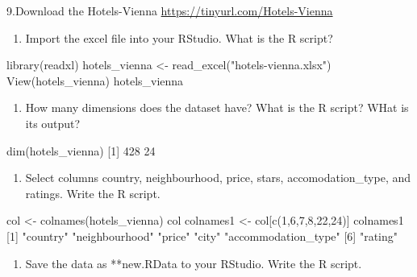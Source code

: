 \documentclass[
]{article}
\newenvironment{Shaded}{\begin{snugshade}}{\end{snugshade}}
\newcommand{\NormalTok}[1]{#1}
\providecommand{\tightlist}{%
  \setlength{\itemsep}{0pt}\setlength{\parskip}{0pt}}
\begin{document}
9.Download the Hotels-Vienna \url{https://tinyurl.com/Hotels-Vienna}

\begin{enumerate}
\def\labelenumi{\alph{enumi}.}
\tightlist
\item
  Import the excel file into your RStudio. What is the R script?
\end{enumerate}

\begin{Shaded}
\begin{Highlighting}[]
\NormalTok{library(readxl)}
\NormalTok{hotels\_vienna \textless{}{-} read\_excel("hotels{-}vienna.xlsx")}
\NormalTok{View(hotels\_vienna)}
\NormalTok{hotels\_vienna}
\end{Highlighting}
\end{Shaded}

\begin{enumerate}
\def\labelenumi{\alph{enumi}.}
\setcounter{enumi}{1}
\tightlist
\item
  How many dimensions does the dataset have? What is the R script? WHat
  is its output?
\end{enumerate}

\begin{Shaded}
\begin{Highlighting}[]
\NormalTok{dim(hotels\_vienna)  }
\NormalTok{[1] 428  24}
\end{Highlighting}
\end{Shaded}

\begin{enumerate}
\def\labelenumi{\alph{enumi}.}
\setcounter{enumi}{2}
\tightlist
\item
  Select columns country, neighbourhood, price, stars,
  accomodation\_type, and ratings. Write the R script.
\end{enumerate}

\begin{Shaded}
\begin{Highlighting}[]
\NormalTok{col \textless{}{-} colnames(hotels\_vienna)}
\NormalTok{col}
\NormalTok{colnames1 \textless{}{-} col[c(1,6,7,8,22,24)]}
\NormalTok{colnames1 }
\NormalTok{[1] "country"            "neighbourhood"      "price"              "city"            "accommodation\_type"}
\NormalTok{[6] "rating"}
\end{Highlighting}
\end{Shaded}

\begin{enumerate}
\def\labelenumi{\alph{enumi}.}
\setcounter{enumi}{3}
\tightlist
\item
  Save the data as **new.RData to your RStudio. Write the R script.
\end{enumerate}
\end{document}
